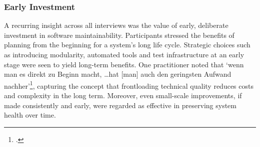 \subsubsection{Early Investment}
A recurring insight across all interviews was the value of early, deliberate investment in software maintainability. Participants stressed the benefits of planning from the beginning for a system's long life cycle. Strategic choices such as introducing modularity, automated tools and test infrastructure at an early stage were seen to yield long-term benefits.
One practitioner noted that `wenn man es direkt zu Beginn macht, \ldots hat [man] auch den geringsten Aufwand nachher'\footcite[82]{Interview32025}, capturing the concept that frontloading technical quality reduces costs and complexity in the long term. Moreover, even small-scale improvements, if made consistently and early, were regarded as effective in preserving system health over time.

